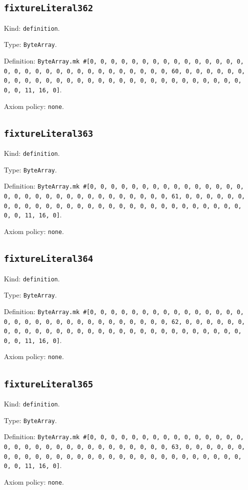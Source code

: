 \documentclass[11pt]{article}
\begin{document}
\subsection*{\texttt{fixtureLiteral362}}
\noindent Kind: \texttt{definition}.\par
\noindent Type: \texttt{ByteArray}.\par
\noindent Definition: \texttt{ByteArray.mk \#[0, 0, 0, 0, 0, 0, 0, 0, 0, 0, 0, 0, 0, 0, 0, 0, 0, 0, 0, 0, 0, 0, 0, 0, 0, 0, 0, 0, 0, 0, 0, 60, 0, 0, 0, 0, 0, 0, 0, 0, 0, 0, 0, 0, 0, 0, 0, 0, 0, 0, 0, 0, 0, 0, 0, 0, 0, 0, 0, 0, 0, 0, 0, 11, 16, 0]}.\par
\noindent Axiom policy: \texttt{none}.\par
\subsection*{\texttt{fixtureLiteral363}}
\noindent Kind: \texttt{definition}.\par
\noindent Type: \texttt{ByteArray}.\par
\noindent Definition: \texttt{ByteArray.mk \#[0, 0, 0, 0, 0, 0, 0, 0, 0, 0, 0, 0, 0, 0, 0, 0, 0, 0, 0, 0, 0, 0, 0, 0, 0, 0, 0, 0, 0, 0, 0, 61, 0, 0, 0, 0, 0, 0, 0, 0, 0, 0, 0, 0, 0, 0, 0, 0, 0, 0, 0, 0, 0, 0, 0, 0, 0, 0, 0, 0, 0, 0, 0, 11, 16, 0]}.\par
\noindent Axiom policy: \texttt{none}.\par
\subsection*{\texttt{fixtureLiteral364}}
\noindent Kind: \texttt{definition}.\par
\noindent Type: \texttt{ByteArray}.\par
\noindent Definition: \texttt{ByteArray.mk \#[0, 0, 0, 0, 0, 0, 0, 0, 0, 0, 0, 0, 0, 0, 0, 0, 0, 0, 0, 0, 0, 0, 0, 0, 0, 0, 0, 0, 0, 0, 0, 62, 0, 0, 0, 0, 0, 0, 0, 0, 0, 0, 0, 0, 0, 0, 0, 0, 0, 0, 0, 0, 0, 0, 0, 0, 0, 0, 0, 0, 0, 0, 0, 11, 16, 0]}.\par
\noindent Axiom policy: \texttt{none}.\par
\subsection*{\texttt{fixtureLiteral365}}
\noindent Kind: \texttt{definition}.\par
\noindent Type: \texttt{ByteArray}.\par
\noindent Definition: \texttt{ByteArray.mk \#[0, 0, 0, 0, 0, 0, 0, 0, 0, 0, 0, 0, 0, 0, 0, 0, 0, 0, 0, 0, 0, 0, 0, 0, 0, 0, 0, 0, 0, 0, 0, 63, 0, 0, 0, 0, 0, 0, 0, 0, 0, 0, 0, 0, 0, 0, 0, 0, 0, 0, 0, 0, 0, 0, 0, 0, 0, 0, 0, 0, 0, 0, 0, 11, 16, 0]}.\par
\noindent Axiom policy: \texttt{none}.\par
\end{document}
